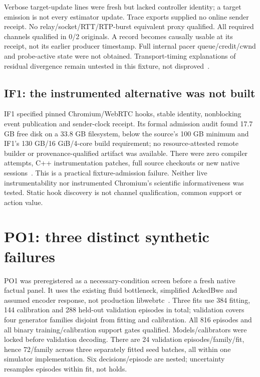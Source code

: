 \documentclass[10pt]{article}
\begin{document}
Verbose target-update lines were fresh but lacked controller identity; a target
emission is not every estimator update. Trace exports supplied no online sender
receipt. No relay/socket/RTT/RTP-burst equivalent proxy qualified. All required
channels qualified in 0/2 originals. A record becomes causally usable at its
receipt, not its earlier producer timestamp. Full internal pacer queue/credit/cwnd
and probe-active state were not obtained. Transport-timing explanations of
residual divergence remain untested in this fixture, not disproved~\cite{m11r}.

\subsection{IF1: the instrumented alternative was not built}
IF1 specified pinned Chromium/WebRTC hooks, stable identity, nonblocking event
publication and sender-clock receipt. Its formal admission audit found 17.7 GB
free disk on a 33.8 GB filesystem, below the source's 100 GB minimum and IF1's
130 GB/16 GiB/4-core build requirement; no resource-attested remote builder or
provenance-qualified artifact was available. There were zero compiler attempts,
C++ instrumentation patches, full source checkouts or new native sessions~\cite{if1}.
This is a practical fixture-admission failure. Neither live instrumentability nor
instrumented Chromium's scientific informativeness was tested. Static hook
discovery is not channel qualification, common support or action value.

\section{PO1: three distinct synthetic failures}
\label{sec:po1}
PO1 was preregistered as a necessary-condition screen before a fresh native
factual panel. It uses the existing fluid bottleneck, simplified AckedBwe and
assumed encoder response, not production libwebrtc~\cite{gcc,po1}.
Three fits use 384 fitting, 144 calibration and 288 held-out validation episodes
in total; validation covers four generator families disjoint from fitting and
calibration. All 816 episodes and all binary training/calibration support gates
qualified. Models/calibrators were locked before validation decoding. There are
24 validation episodes/family/fit, hence 72/family across three separately fitted
seed batches, all within one simulator implementation. Six decisions/episode
are nested; uncertainty resamples episodes within fit, not holds.
\end{document}
